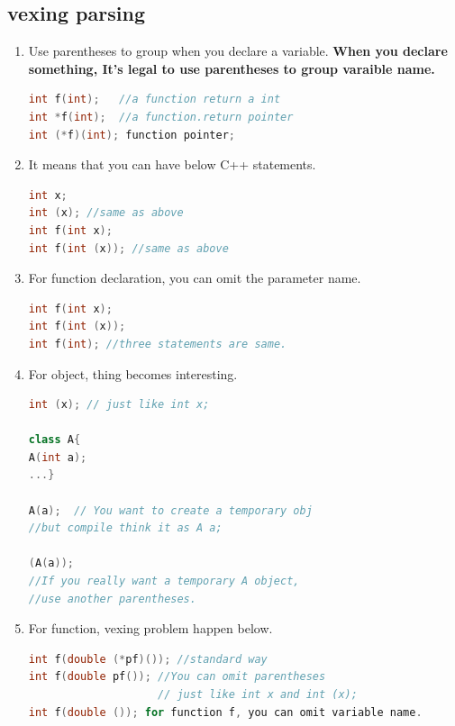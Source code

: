 \documentclass[a4paper,12pt,twoside]{book}
\begin{document}
\subsection{vexing parsing}
\begin{enumerate}

\item Use parentheses to group when you declare a variable. \textbf{When you declare something, It's legal to use parentheses to group varaible name.}
\begin{lstlisting}[frame=single, language=c++, mathescape=true]
int f(int);   //a function return a int
int *f(int);  //a function.return pointer
int (*f)(int); function pointer;
\end{lstlisting}

\item It means that you can have below C++ statements. 
\begin{lstlisting}[frame=single, language=c++, mathescape=true]
int x;
int (x); //same as above
int f(int x);
int f(int (x)); //same as above
\end{lstlisting}

\item For function declaration, you can omit the parameter name.  
\begin{lstlisting}[frame=single, language=c++, mathescape=true]
int f(int x);
int f(int (x));
int f(int); //three statements are same. 
\end{lstlisting}

\item For object, thing becomes interesting.
\begin{lstlisting}[frame=single, language=c++, mathescape=true]
int (x); // just like int x;

class A{
A(int a);
...}

A(a);  // You want to create a temporary obj
//but compile think it as A a;

(A(a)); 
//If you really want a temporary A object,
//use another parentheses. 
\end{lstlisting}

\item For function, vexing problem happen below.
\begin{lstlisting}[frame=single, language=c++, mathescape=true]
int f(double (*pf)()); //standard way
int f(double pf()); //You can omit parentheses
                    // just like int x and int (x);
int f(double ()); for function f, you can omit variable name.                   
\end{lstlisting}


\end{enumerate}
\end{document}
